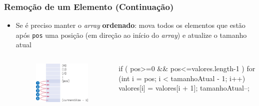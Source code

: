\documentclass[xcolor={dvipsnames,table},aspectratio=169]{beamer}
\begin{document}
\begin{frame}[fragile]\frametitle{Remoção de um Elemento (Continuação)}
\begin{itemize}
	\item Se é preciso manter o \emph{array} \textbf{ordenado}: mova todos os elementos que estão após \texttt{pos} uma posição (em direção ao início do \emph{array}) e atualize o tamanho atual
\begin{columns}[T]
	\begin{column}{0.35\linewidth}
\begin{figure}[h]
	\includegraphics[height=0.35\paperheight,center]{pucrs-ep-fprog-unidade_06-arrays-laminas-remocao_b.png}
\end{figure}
	\end{column}
	\begin{column}{0.65\linewidth}
{\scriptsize
\begin{javacode}
if ( pos>=0 && pos<=valores.length-1 ) {
   for (int i = pos; i < tamanhoAtual - 1; i++) {
      valores[i] = valores[i + 1];
   }
   tamanhoAtual--;
}
\end{javacode}
}
	\end{column}
\end{columns}
\end{itemize}
\end{frame}
\end{document}
